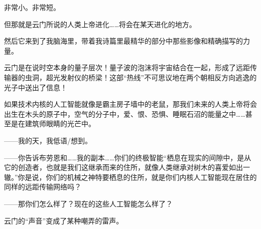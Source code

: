 \documentclass[AutoFakeBold=true]{book}
\begin{document}
非常小。非常短。

但那就是云门所说的人类上帝进化……将会在某天进化的地方。

然后它来到了我脑海里，带着我诗篇里最精华的部分中那些影像和精确描写的力量。

{\kaishu 云门是在说时空本身的量子层次！量子波的泡沫将宇宙结合在一起，形成了远距传输器的虫洞，超光发射仪的桥梁！这部``热线''不可思议地在两个朝相反方向逃逸的光子中送出了信息！}

如果技术内核的人工智能就像是霸主房子墙中的老鼠，那我们未来的人类上帝将会出生在木头的原子中，空气的分子中，爱、恨、恐惧、睡眠石沼的能量之中……甚至是在建筑师眼睛的光芒中。

\vspace*{1em}

{\kaishu ——我的天}，我低语/想到。

{}

{\kaishu ——你告诉布劳恩和……我的副本……你们的终极智能``栖息在现实的间隙中，是从它的创造者，也就是我们这继承而来的住所，就像人类继承对树木的喜爱如出一辙。''你是说，你们的机械之神特要栖息的住所，就是你们内核人工智能现在居住的同样的远距传输网络吗？}

{\heiti [对/济慈]}

{\kaishu ——那你们怎么样了？现在的这些人工智能怎么样了？}

云门的``声音''变成了某种嘲弄的雷声。

{}
\end{document}
